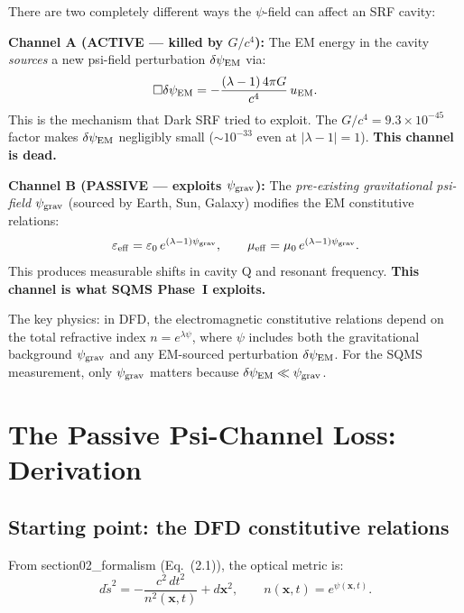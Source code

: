 \documentclass[11pt]{article}
\newcommand{\lam}{\lambda}
\newcommand{\ee}[1]{\times 10^{#1}}
\newcommand{\psigrav}{\psi_{\rm grav}}
\newcommand{\dpsiEM}{\delta\psi_{\rm EM}}
\theoremstyle{definition}
\theoremstyle{remark}
\begin{document}
\begin{tcolorbox}[colback=red!5!white, colframe=red!60!black,
  title=\textbf{THE CRITICAL DISTINCTION}]
There are two completely different ways the $\psi$-field can affect an
SRF cavity:

\textbf{Channel A (ACTIVE --- killed by $G/c^4$):}
The EM energy in the cavity \emph{sources} a new psi-field perturbation
$\dpsiEM$ via:
\begin{equation}
\Box\dpsiEM = -\frac{(\lam-1)\,4\pi G}{c^4}\,u_{\rm EM}.
\end{equation}
This is the mechanism that Dark SRF tried to exploit. The $G/c^4 =
9.3\ee{-45}$ factor makes $\dpsiEM$ negligibly small ($\sim 10^{-33}$
even at $|\lam-1| = 1$). \textbf{This channel is dead.}

\textbf{Channel B (PASSIVE --- exploits $\psigrav$):}
The \emph{pre-existing gravitational psi-field} $\psigrav$ (sourced by
Earth, Sun, Galaxy) modifies the EM constitutive relations:
\begin{equation}
\varepsilon_{\rm eff} = \varepsilon_0\,e^{(\lam-1)\psigrav}, \qquad
\mu_{\rm eff} = \mu_0\,e^{(\lam-1)\psigrav}.
\end{equation}
This produces measurable shifts in cavity Q and resonant frequency.
\textbf{This channel is what SQMS Phase~I exploits.}
\end{tcolorbox}

The key physics: in DFD, the electromagnetic constitutive relations
depend on the total refractive index $n = e^{\lam\psi}$, where $\psi$
includes both the gravitational background $\psigrav$ and any
EM-sourced perturbation $\dpsiEM$. For the SQMS measurement, only
$\psigrav$ matters because $\dpsiEM \ll \psigrav$.


\section{The Passive Psi-Channel Loss: Derivation}
\label{sec:passive_derivation}

\subsection{Starting point: the DFD constitutive relations}

From section02\_formalism (Eq.~(2.1)), the optical metric is:
\begin{equation}
d\tilde{s}^2 = -\frac{c^2\,dt^2}{n^2(\mathbf{x},t)} + d\mathbf{x}^2,
\qquad n(\mathbf{x},t) = e^{\psi(\mathbf{x},t)}.
\label{eq:optical_metric}
\end{equation}
\end{document}
